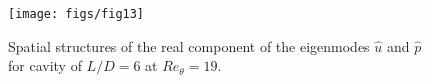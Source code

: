 \documentclass{jfm}
\begin{document}
\begin{figure}
\begin{center}
 \texttt{[image: figs/fig13]}
 \caption{Spatial structures of the real component of the eigenmodes $\hat u$ and $\hat p$ for cavity of $L/D=6$ at $Re_\theta=19$.} 
       \label{fig:beta0_eigenmode_LD6} 
\end{center}
\end{figure}

%
\end{document}
